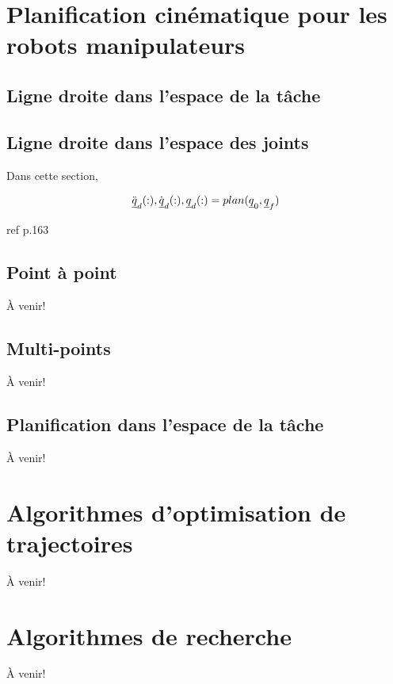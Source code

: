\newpage
\section{Planification cinématique pour les robots manipulateurs}

\subsection{Ligne droite dans l'espace de la tâche}

\subsection{Ligne droite dans l'espace des joints}

Dans cette section, 

%
\begin{align}
  \ddot{\underline{q}}_d(:),\dot{\underline{q}}_d(:),\underline{q}_d(:) = plan(\underline{q}_{0}, \underline{q}_f)
	\label{eq:trajgen}
\end{align}
%

ref p.163



\subsection{Point à point}
À venir!

\subsection{Multi-points}
À venir!



\subsection{Planification dans l'espace de la tâche}
À venir!



\section{Algorithmes d'optimisation de trajectoires}



À venir!

\section{Algorithmes de recherche}

À venir!
